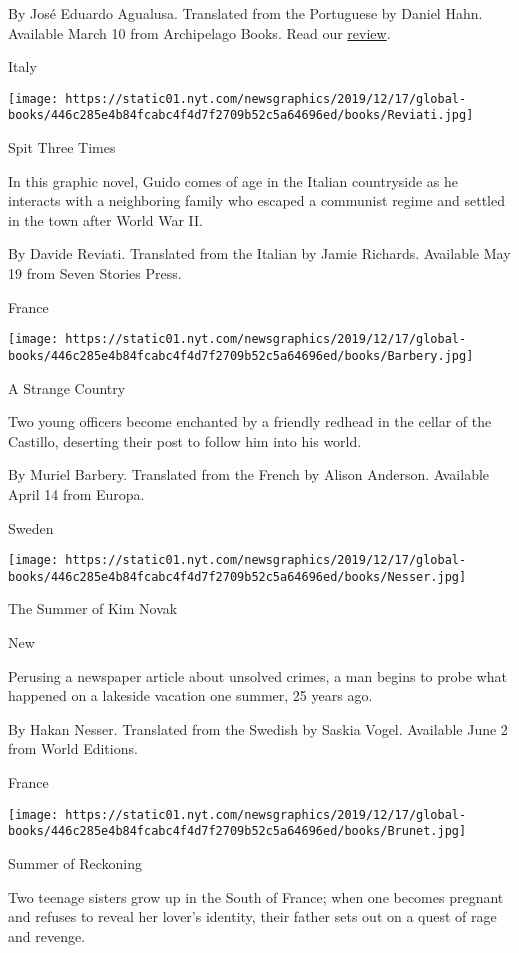 By José Eduardo Agualusa. Translated from the Portuguese by Daniel
Hahn. Available March 10 from Archipelago Books. Read our
\href{https://www.nytimes.com/2019/03/11/books/review-arturos-island-elsa-morante-ann-goldstein.html}{review}.

Italy

\texttt{[image: https://static01.nyt.com/newsgraphics/2019/12/17/global-books/446c285e4b84fcabc4f4d7f2709b52c5a64696ed/books/Reviati.jpg]}

Spit Three Times

In this graphic novel, Guido comes of age in the Italian countryside as
he interacts with a neighboring family who escaped a communist regime
and settled in the town after World War II.

 By Davide Reviati. Translated from the Italian by Jamie Richards.
Available May 19 from Seven Stories Press.

France

\texttt{[image: https://static01.nyt.com/newsgraphics/2019/12/17/global-books/446c285e4b84fcabc4f4d7f2709b52c5a64696ed/books/Barbery.jpg]}

A Strange Country

Two young officers become enchanted by a friendly redhead in the cellar
of the Castillo, deserting their post to follow him into his world.

 By Muriel Barbery. Translated from the French by Alison Anderson.
Available April 14 from Europa.

Sweden

\texttt{[image: https://static01.nyt.com/newsgraphics/2019/12/17/global-books/446c285e4b84fcabc4f4d7f2709b52c5a64696ed/books/Nesser.jpg]}

The Summer of Kim Novak

New

Perusing a newspaper article about unsolved crimes, a man begins to
probe what happened on a lakeside vacation one summer, 25 years ago.

 By Hakan Nesser. Translated from the Swedish by Saskia Vogel. Available
June 2 from World Editions.

France

\texttt{[image: https://static01.nyt.com/newsgraphics/2019/12/17/global-books/446c285e4b84fcabc4f4d7f2709b52c5a64696ed/books/Brunet.jpg]}

Summer of Reckoning

Two teenage sisters grow up in the South of France; when one becomes
pregnant and refuses to reveal her lover's identity, their father sets
out on a quest of rage and revenge.

